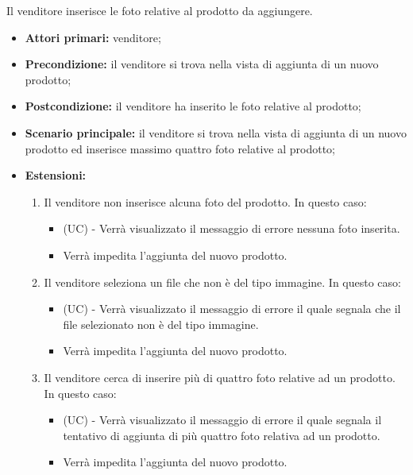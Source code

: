 Il venditore inserisce le foto relative al prodotto da aggiungere.
\begin{itemize}
    \item \textbf{Attori primari:} venditore;
    \item \textbf{Precondizione:} il venditore si trova nella vista di aggiunta di un nuovo prodotto;
    \item \textbf{Postcondizione:} il venditore ha inserito le foto relative al prodotto;
    \item \textbf{Scenario principale:} il venditore si trova nella vista di aggiunta di un nuovo prodotto ed inserisce massimo quattro foto relative al prodotto;
    \item \textbf{Estensioni:}
    \begin{enumerate}
    	\item Il venditore non inserisce alcuna foto del prodotto. In questo caso:
    	\begin{itemize}
    		\item (UC) - Verrà visualizzato il messaggio di errore nessuna foto inserita.
    		\item Verrà impedita l'aggiunta del nuovo prodotto.
    	\end{itemize}
    	\item Il venditore seleziona un file che non è del tipo immagine. In questo caso:
    	\begin{itemize}
    		\item (UC) - Verrà visualizzato il messaggio di errore il quale segnala che il file selezionato non è del tipo immagine.
    		\item Verrà impedita l'aggiunta del nuovo prodotto.
    	\end{itemize}
    	\item Il venditore cerca di inserire più di quattro foto relative ad un prodotto. In questo caso:
    	\begin{itemize}
    		\item (UC) - Verrà visualizzato il messaggio di errore il quale segnala il tentativo di aggiunta di più quattro foto relativa ad un prodotto.
    		\item Verrà impedita l'aggiunta del nuovo prodotto.
    	\end{itemize}
    \end{enumerate}
\end{itemize}

